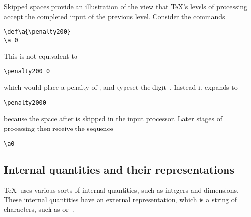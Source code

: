 \documentclass{book}
\begin{document}
Skipped spaces provide an illustration of the view that
\TeX's levels of processing accept the completed input
of the previous level. Consider the commands
\begin{verbatim}
\def\a{\penalty200}
\a 0
\end{verbatim} 
This is {\italic not\/} equivalent to
\begin{verbatim}
\penalty200 0
\end{verbatim} 
which would place a penalty of , and
typeset the digit~. Instead it expands to
\begin{verbatim}
\penalty2000
\end{verbatim}
because the space after  is skipped in the
input processor. Later stages of processing then receive
the sequence \begin{verbatim}
\a0
\end{verbatim}

\subsection{Internal quantities and their representations}

\TeX\ uses various sorts of internal quantities,
such as integers and dimensions. These internal
quantities have an external representation,
which is a string of characters, such as 
 or~\n{91.44cm}.
\end{document}

